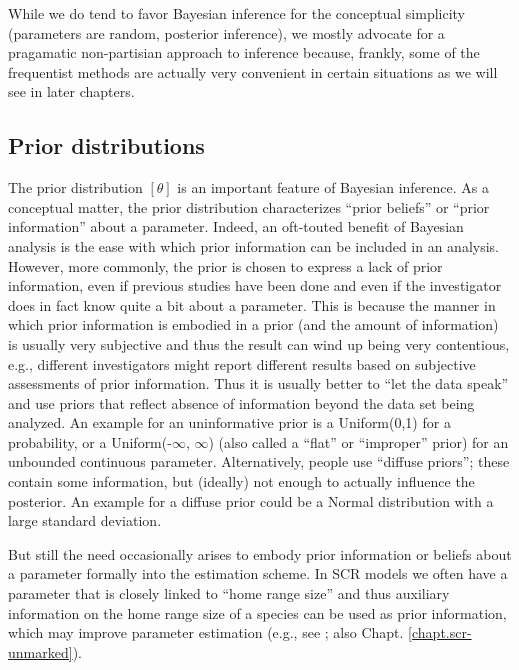 While we do tend to favor Bayesian inference for the conceptual
simplicity (parameters are random, posterior inference), we mostly
advocate for a pragamatic non-partisian approach to inference because,
frankly, some of the frequentist methods are actually very
convenient in certain situations as we will see in later chapters.


\subsection{Prior distributions}

The prior distribution $[\theta]$ is an important feature of Bayesian
inference. As a conceptual matter,
the prior distribution characterizes ``prior beliefs'' or ``prior
information'' about a parameter. Indeed,
an oft-touted benefit of Bayesian analysis is the ease with which
prior information can be included in an analysis. 
However, more commonly, the prior is chosen to
express a lack of prior information, even if previous studies have
been done and even if the investigator does in fact know quite a bit
about a parameter.
This is because
the manner in which prior information is embodied in a prior (and the
amount of information) is
usually very subjective and thus the result can wind up being very
contentious, e.g., different investigators might report different
results based on subjective assessments of prior information. Thus it is usually
better to ``let the data speak'' and use priors that reflect absence
of information beyond the data set being analyzed. An example for an uninformative prior is a Uniform(0,1) for a probability, or a Uniform(-$\infty$, $\infty$) (also called a ``flat'' or ``improper'' prior) for an unbounded continuous parameter. Alternatively, people use ``diffuse priors''; these contain some information, but (ideally) not enough to actually influence the posterior. An example for a diffuse prior could be a Normal distribution with a large standard deviation.

But still the need occasionally arises to embody prior information or
beliefs about a parameter formally into the estimation scheme.
 In SCR models we often have a parameter that is closely linked
to ``home range size'' and thus auxiliary information on the home
range size of a species can be used as prior information, which may improve parameter estimation (e.g., see
\citet{chandler_royle:2012} ; also Chapt. \ref{chapt.scr-unmarked}).

